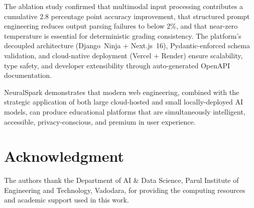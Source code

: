 \documentclass[conference]{IEEEtran}
\begin{document}
The ablation study confirmed that multimodal input processing contributes a cumulative 2.8 percentage point accuracy improvement, that structured prompt engineering reduces output parsing failures to below 2\%, and that near-zero temperature is essential for deterministic grading consistency. The platform's decoupled architecture (Django~Ninja + Next.js~16), Pydantic-enforced schema validation, and cloud-native deployment (Vercel + Render) ensure scalability, type safety, and developer extensibility through auto-generated OpenAPI documentation.

NeuralSpark demonstrates that modern web engineering, combined with the strategic application of both large cloud-hosted and small locally-deployed AI models, can produce educational platforms that are simultaneously intelligent, accessible, privacy-conscious, and premium in user experience.

\section*{Acknowledgment}
The authors thank the Department of AI \& Data Science, Parul Institute of Engineering and Technology, Vadodara, for providing the computing resources and academic support used in this work.
\end{document}
